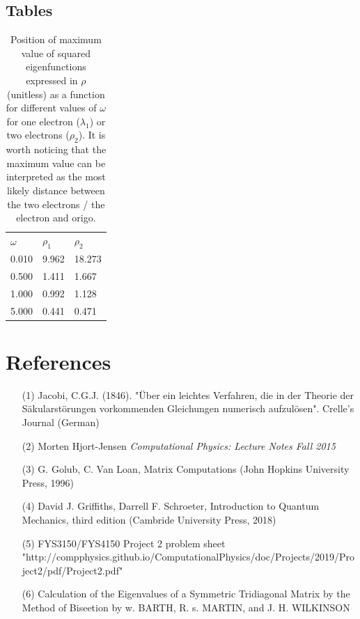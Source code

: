 \documentclass[10pt,a4paper]{article}
\begin{document}
\subsection{Tables}
\begin{table}[H]
\caption[Maximum value of eigenfunctions$^2$]{Position of maximum value of squared eigenfunctions expressed in $\rho$ (unitless) as a function for different values of $\omega$ for one electron ($\lambda_1$) or two electrons ($\rho_2$). It is worth noticing that the maximum value can be interpreted as the most likely distance between the two electrons / the electron and origo.}
\begin{tabular}{lll}
$\omega$ &$\rho_1$ & $\rho_2$  \\
0.010 & 9.962 & 18.273 \\
0.500 &1.411 & 1.667 \\
1.000 &0.992 & 1.128  \\
5.000 &0.441 & 0.471\\
\end{tabular}
\end{table}

\section{References}
\label{method by bisection}
\begin{itemize}
\item[(1)] Jacobi, C.G.J. (1846). "Über ein leichtes Verfahren, die in der Theorie der Säkularstörungen vorkommenden Gleichungen numerisch aufzulösen". Crelle's Journal (German)
\item[(2)] Morten Hjort-Jensen \textit{Computational Physics: Lecture Notes Fall 2015}
\item[(3)]G. Golub, C. Van Loan, Matrix Computations (John Hopkins University Press, 1996)
\item[(4)]David J. Griffiths, Darrell F. Schroeter, Introduction to Quantum Mechanics, third edition (Cambride University Press, 2018)
\item[(5)] FYS3150/FYS4150 Project 2 problem sheet "http://compphysics.github.io/ComputationalPhysics/doc/Projects/2019/Project2/pdf/Project2.pdf"
\item[(6)]Calculation of the Eigenvalues of a Symmetric Tridiagonal
Matrix by the Method of Biseetion
by w. BARTH, R. s. MARTIN, and J. H. WILKINSON
\end{itemize}
\end{document}
